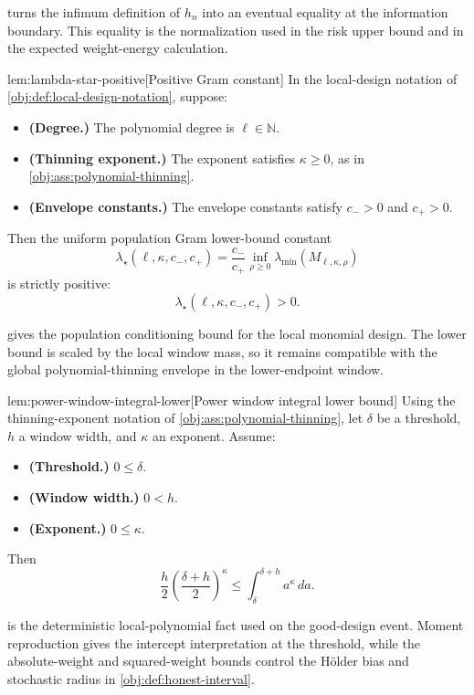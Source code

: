  turns the infimum definition of \(h_n\) into an eventual equality at the information boundary. This equality is the normalization used in the risk upper bound and in the expected weight-energy calculation.

\begin{lemmav}{lem:lambda-star-positive}[Positive Gram constant]
In the local-design notation of \cref{obj:def:local-design-notation}, suppose:
\begin{itemize}
\item \textbf{(Degree.)} The polynomial degree is \(\ell\in\mathbb N\).
\item \textbf{(Thinning exponent.)} The exponent satisfies \(\kappa\ge 0\), as in \cref{obj:ass:polynomial-thinning}.
\item \textbf{(Envelope constants.)} The envelope constants satisfy \(c_->0\) and \(c_+>0\).
\end{itemize}
Then the uniform population Gram lower-bound constant
\[
\lambda_\star(\ell,\kappa,c_-,c_+)
=
\frac{c_-}{c_+}\inf_{\rho\ge 0}\lambda_{\min}(M_{\ell,\kappa,\rho})
\]
is strictly positive:
\[
\lambda_\star(\ell,\kappa,c_-,c_+)>0.
\]
\end{lemmav}

 gives the population conditioning bound for the local monomial design. The lower bound is scaled by the local window mass, so it remains compatible with the global polynomial-thinning envelope in the lower-endpoint window.

\begin{lemmav}{lem:power-window-integral-lower}[Power window integral lower bound]
Using the thinning-exponent notation of \cref{obj:ass:polynomial-thinning}, let \(\delta\) be a threshold, \(h\) a window width, and \(\kappa\) an exponent. Assume:
\begin{itemize}
\item \textbf{(Threshold.)} \(0\le \delta\).
\item \textbf{(Window width.)} \(0<h\).
\item \textbf{(Exponent.)} \(0\le \kappa\).
\end{itemize}
Then
\[
\frac{h}{2}\left(\frac{\delta+h}{2}\right)^{\kappa}
\le
\int_{\delta}^{\delta+h} a^{\kappa}\,da .
\]
\end{lemmav}

 is the deterministic local-polynomial fact used on the good-design event. Moment reproduction gives the intercept interpretation at the threshold, while the absolute-weight and squared-weight bounds control the Hölder bias and stochastic radius in \cref{obj:def:honest-interval}.


